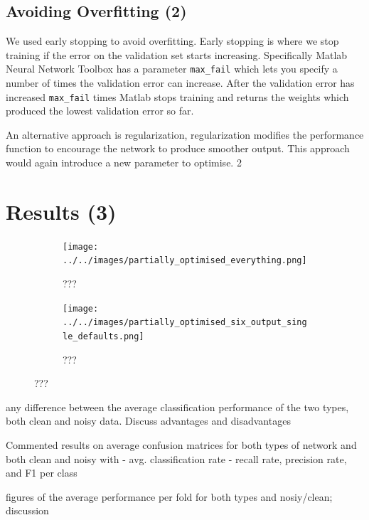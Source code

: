 \documentclass[10pt,a4paper]{article}
\begin{document}
\subsection{Avoiding Overfitting (2)}
We used early stopping to avoid overfitting.
Early stopping is where we stop training if the error on the validation set starts increasing.
Specifically Matlab Neural Network Toolbox has a parameter {\tt max\_fail} which lets you specify a number of 
times the validation error can increase. 
After the validation error has increased {\tt max\_fail} times Matlab stops training and returns the weights which produced the lowest validation error so far.

An alternative approach is regularization, regularization modifies the performance function to encourage the network to produce smoother output.
This approach would again introduce a new parameter to optimise.
2

\section{Results (3)}

\begin{figure}[!ht]
     \centering
     \begin{subfigure}[b]{0.495\textwidth}
     	\texttt{[image: ../../images/partially\_optimised\_everything.png]}
     	\caption{???}
     	\label{fig:tree2}
     \end{subfigure}
     \begin{subfigure}[b]{0.495\textwidth}
     	\texttt{[image: ../../images/partially\_optimised\_six\_output\_single\_defaults.png]}
     	\caption{???}
     	\label{fig:tree2}
     \end{subfigure}
\end{figure}


any difference between the average classification performance of the two types, both clean and noisy data. Discuss advantages and disadvantages

Commented results on average confusion matrices for both types of network and both clean and noisy with 
	- avg. classification rate
	- recall rate, precision rate, and F1 per class

figures of the average performance per fold for both types and nosiy/clean; discussion
\end{document}
